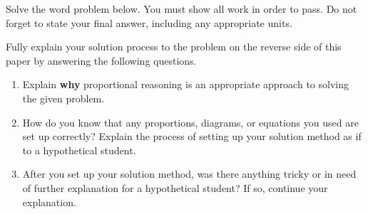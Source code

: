 
Solve the word problem below. You must show all work in order to pass. Do not forget to state your final answer, including any appropriate units.

\begin{statement}
\end{statement}

\begin{ansenv}
    \vspace{12pt}
\end{ansenv}

\newpage
{}

Fully explain your solution process to the problem on the reverse side of this paper by answering the following questions.
\begin{enumerate}
    \item Explain \textbf{why} proportional reasoning is an appropriate approach to solving the given problem.

    \vfill

    \item How do you know that any proportions, diagrams, or equations you used are set up correctly? Explain the process of setting up your solution method as if to a hypothetical student.

    \vfill

    \item After you set up your solution method, was there anything tricky or in need of further explanation for a hypothetical student? If so, continue your explanation.

    \vfill

\end{enumerate}